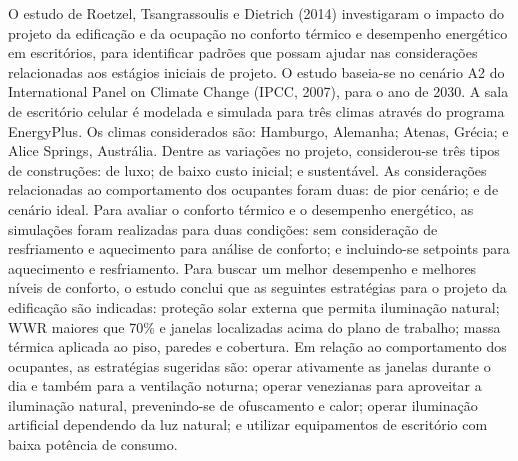 \documentclass[brazil,hardcopy,openany,a5paper]{ufscthesis}
\begin{document}
	O estudo de Roetzel, Tsangrassoulis e Dietrich (2014) investigaram o impacto do projeto da edificação e da ocupação no conforto térmico e
	desempenho energético em escritórios, para identificar padrões que possam ajudar nas considerações relacionadas aos estágios iniciais de projeto. O estudo baseia-se no cenário A2 do International Panel on Climate Change (IPCC, 2007), para o ano de 2030. A sala de escritório celular é modelada e simulada para três climas através do programa EnergyPlus. Os climas considerados são: Hamburgo, Alemanha; Atenas, Grécia; e Alice Springs, Austrália. Dentre as variações no projeto, considerou-se três tipos de construções: de luxo; de baixo custo inicial; e sustentável. As considerações relacionadas ao comportamento dos ocupantes foram duas: de pior cenário; e de cenário ideal. Para avaliar o conforto térmico e o desempenho energético, as simulações foram realizadas para duas condições: sem consideração de resfriamento e aquecimento para análise de conforto; e incluindo-se setpoints para aquecimento e resfriamento.
	Para buscar um melhor desempenho e melhores níveis de conforto, o estudo conclui que as seguintes estratégias para o projeto da edificação são indicadas: proteção solar externa que permita iluminação natural; WWR maiores que 70\% e janelas localizadas acima do plano de trabalho; massa térmica aplicada ao piso, paredes e cobertura. Em relação ao comportamento dos ocupantes, as estratégias sugeridas são: operar ativamente as janelas durante o dia e também para a ventilação noturna; operar venezianas para aproveitar a iluminação natural, prevenindo-se de ofuscamento e calor; operar iluminação artificial dependendo da luz natural; e utilizar equipamentos de escritório com baixa potência de consumo.
	
\end{document}
